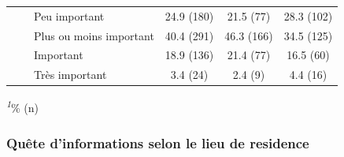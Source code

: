 \documentclass[
]{article}
\begin{document}
\begin{table}[!t]
\begin{tabular*}{\linewidth}{@{\extracolsep{\fill}}lccc}
    Peu important & 24.9 (180) & 21.5 (77) & 28.3 (102) \\ 
    Plus ou moins important & 40.4 (291) & 46.3 (166) & 34.5 (125) \\ 
    Important & 18.9 (136) & 21.4 (77) & 16.5 (60) \\ 
    Très important & 3.4 (24) & 2.4 (9) & 4.4 (16) \\ 
\bottomrule
\end{tabular*}
\begin{minipage}{\linewidth}
\textsuperscript{\textit{1}}\% (n)\\
\end{minipage}
\end{table}

\hypertarget{quuxeate-dinformations-selon-le-lieu-de-residence}{%
\subsubsection{Quête d'informations selon le lieu de
residence}\label{quuxeate-dinformations-selon-le-lieu-de-residence}}
\end{document}
